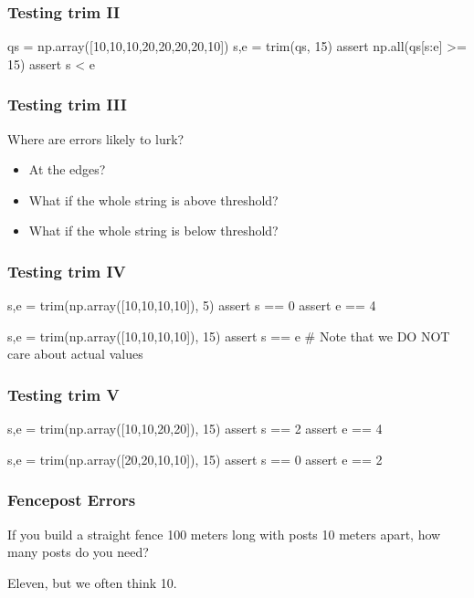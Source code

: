 \begin{frame}[fragile]
\frametitle{Testing trim II}
\begin{python}

qs = np.array([10,10,10,20,20,20,20,10])
s,e = trim(qs, 15)
assert np.all(qs[s:e] >= 15)
assert s < e
\end{python}
\end{frame}

\begin{frame}[fragile]
\frametitle{Testing trim III}

Where are errors likely to lurk?
\pause

\begin{itemize}
\item At the edges?
\item What if the whole string is \alert{above} threshold?
\item What if the whole string is \alert{below} threshold?
\end{itemize}

\end{frame}

\begin{frame}[fragile]
\frametitle{Testing trim IV}
\begin{python}

s,e = trim(np.array([10,10,10,10]), 5)
assert s == 0
assert e == 4

s,e = trim(np.array([10,10,10,10]), 15)
assert s == e # Note that we DO NOT care about actual values
\end{python}
\end{frame}

\begin{frame}[fragile]
\frametitle{Testing trim V}
\begin{python}

s,e = trim(np.array([10,10,20,20]), 15)
assert s == 2
assert e == 4

s,e = trim(np.array([20,20,10,10]), 15)
assert s == 0
assert e == 2
\end{python}
\end{frame}

\begin{frame}[fragile]
\frametitle{Fencepost Errors}

If you build a straight fence 100 meters long with posts 10 meters apart, how
many posts do you need?

\pause

Eleven, but we often think 10.

\end{frame}

